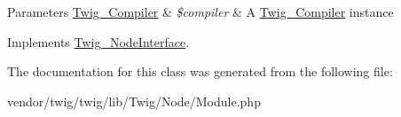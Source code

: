 \begin{DoxyParams}[1]{Parameters}
\hyperlink{classTwig__Compiler}{Twig\+\_\+\+Compiler} & {\em \$compiler} & A \hyperlink{classTwig__Compiler}{Twig\+\_\+\+Compiler} instance \\
\hline
\end{DoxyParams}


Implements \hyperlink{interfaceTwig__NodeInterface_a8d549ab245f11ac9c2d71b8de6f669e6}{Twig\+\_\+\+Node\+Interface}.



The documentation for this class was generated from the following file\+:\begin{DoxyCompactItemize}
\item 
vendor/twig/twig/lib/\+Twig/\+Node/Module.\+php\end{DoxyCompactItemize}
